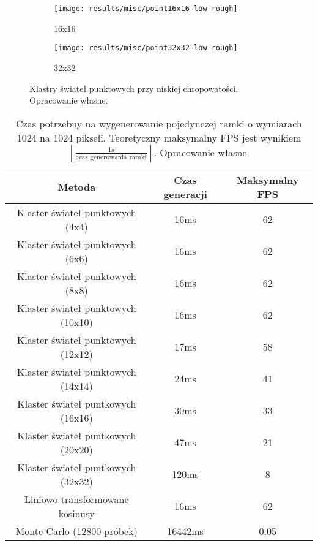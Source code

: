\documentclass[../main.tex]{subfiles}
\begin{document}
\begin{figure}
    \centering
    \begin{subfigure}{0.45\textwidth}
        \texttt{[image: results/misc/point16x16-low-rough]}
        \caption{16x16}
    \end{subfigure}
    \begin{subfigure}{0.45\textwidth}
        \texttt{[image: results/misc/point32x32-low-rough]}
        \caption{32x32}
    \end{subfigure}
    \caption{Klastry świateł punktowych przy niskiej chropowatości. Opracowanie własne.}
    \label{fig:results:pointManyLowAlpha}
\end{figure}

\begin{table}
    \centering
    \begin{tabular}{|c|c|c|}
        \hline
        Metoda & Czas generacji & Maksymalny FPS \\ \hline
        Klaster świateł punktowych (4x4) & 16ms & 62 \\ \hline
        Klaster świateł punktowych (6x6) & 16ms & 62 \\ \hline
        Klaster świateł punktowych (8x8) & 16ms & 62 \\ \hline
        Klaster świateł punktowych (10x10) & 16ms & 62 \\ \hline
        Klaster świateł punktowych (12x12) & 17ms & 58 \\ \hline
        Klaster świateł punktowych (14x14) & 24ms & 41 \\ \hline
        Klaster świateł puntkowych (16x16) & 30ms & 33 \\ \hline
        Klaster świateł puntkowych (20x20) & 47ms & 21 \\ \hline
        Klaster świateł puntkowych (32x32) & 120ms & 8 \\ \hline
        Liniowo transformowane kosinusy & 16ms & 62 \\ \hline
        Monte-Carlo (12800 próbek)& 16442ms & 0.05 \\
        \hline
    \end{tabular}
    \caption{Czas potrzebny na wygenerowanie pojedynczej ramki o wymiarach 1024 na 1024 pikseli. Teoretyczny maksymalny FPS jest wynikiem $\left \lfloor \frac{1\text{s}}{\text{czas generowania ramki}}\right \rfloor$. Opracowanie własne.}
    \label{tab:performance}
\end{table}
\end{document}
